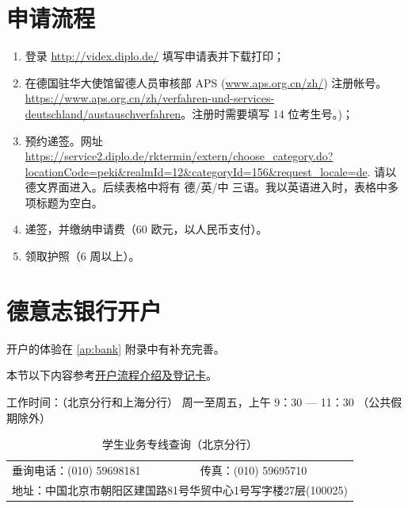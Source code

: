 \documentclass[oneside,final]{book}
\begin{document}
\section{申请流程}
\begin{enumerate}
\item 登录 \url{http://videx.diplo.de/} 填写申请表并下载打印；
\item \sloppy 在德国驻华大使馆留德人员审核部 APS (\url{www.aps.org.cn/zh/}) 注册帐号。\url{https://www.aps.org.cn/zh/verfahren-und-services-deutschland/austauschverfahren}。注册时需要填写 14 位考生号。)；
\item 预约递签。网址 \url{https://service2.diplo.de/rktermin/extern/choose_category.do?locationCode=peki&realmId=12&categoryId=156&request_locale=de}. 请以德文界面进入。后续表格中将有 德/英/中 三语。我以英语进入时，表格中多项标题为空白。 
\item 递签，并缴纳申请费（60 欧元，以人民币支付）。
\item 领取护照（6 周以上）。
\end{enumerate}

\section[德意志银行开户]{德意志银行开户}
开户的体验在 \ref{ap:bank} 附录中有补充完善。

本节以下内容参考\href{https://china.db.com/china/docs/Deutsche_Bank-China-Account-Opening-Process-And-Introduction.pdf}{开户流程介绍及登记卡}。

工作时间：（北京分行和上海分行） 周一至周五，上午 9：30 --- 11：30 （公共假期除外）

\begin{table}[htbp]
\caption{学生业务专线查询（北京分行）}
\label{tb:bank-communication}
\centering
\begin{tabular}{ll}
  垂询电话：(010) 59698181 & 传真：(010) 59695710 \\
  \multicolumn{2}{l}{地址：中国北京市朝阳区建国路81号华贸中心1号写字楼27层(100025)}
\end{tabular}  
\end{table}
\end{document}
